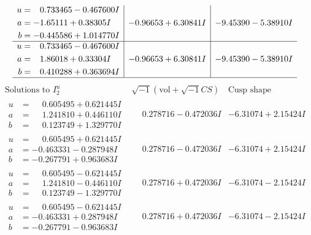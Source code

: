 \documentclass[1p]{elsarticle_modified}
\theoremstyle{definition}
\newcommand{\I}{\sqrt{-1}}
\begin{document}
$$\begin{array}{c|c|c}
\begin{aligned}
u &= \phantom{-}0.733465 - 0.467600 I \\
a &= -1.65111 + 0.38305 I \\
b &= -0.445586 + 1.014770 I\end{aligned}
 & -0.96653 + 6.30841 I & -9.45390 - 5.38910 I \\ \hline\begin{aligned}
u &= \phantom{-}0.733465 - 0.467600 I \\
a &= \phantom{-}1.86018 + 0.33304 I \\
b &= \phantom{-}0.410288 + 0.363694 I\end{aligned}
 & -0.96653 + 6.30841 I & -9.45390 - 5.38910 I\\
 \hline 
 \end{array}$$\newpage$$\begin{array}{c|c|c}  
\text{Solutions to }I^u_{2}& \I (\text{vol} + \sqrt{-1}CS) & \text{Cusp shape}\\
 \hline 
\begin{aligned}
u &= \phantom{-}0.605495 + 0.621445 I \\
a &= \phantom{-}1.241810 + 0.446110 I \\
b &= \phantom{-}0.123749 + 1.329770 I\end{aligned}
 & \phantom{-}0.278716 - 0.472036 I & -6.31074 + 2.15424 I \\ \hline\begin{aligned}
u &= \phantom{-}0.605495 + 0.621445 I \\
a &= -0.463331 - 0.287948 I \\
b &= -0.267791 + 0.963683 I\end{aligned}
 & \phantom{-}0.278716 - 0.472036 I & -6.31074 + 2.15424 I \\ \hline\begin{aligned}
u &= \phantom{-}0.605495 - 0.621445 I \\
a &= \phantom{-}1.241810 - 0.446110 I \\
b &= \phantom{-}0.123749 - 1.329770 I\end{aligned}
 & \phantom{-}0.278716 + 0.472036 I & -6.31074 - 2.15424 I \\ \hline\begin{aligned}
u &= \phantom{-}0.605495 - 0.621445 I \\
a &= -0.463331 + 0.287948 I \\
b &= -0.267791 - 0.963683 I\end{aligned}
 & \phantom{-}0.278716 + 0.472036 I & -6.31074 - 2.15424 I \\ \hline\begin{aligned}

\end{aligned}
\end{array}$$
\end{document}
